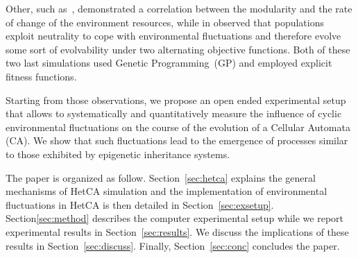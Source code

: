 Other, such as~\cite{lipson2002origin}, demonstrated a correlation between the modularity and the rate of change of the environment resources, while in \cite{yu2007program} observed that populations exploit neutrality to cope with environmental fluctuations and therefore evolve some sort of evolvability under two alternating objective functions. Both of these two last simulations used Genetic Programming~(GP) and employed explicit fitness functions.

Starting from those observations, we propose an open ended experimental setup that allows to systematically and quantitatively measure the influence of cyclic environmental fluctuations on the course of the evolution of a Cellular Automata (CA). We show that such fluctuations lead to the emergence of processes similar to those exhibited by epigenetic inheritance systems. 

The paper is organized as follow. Section~\ref{sec:hetca} explains the general mechanisms of HetCA simulation and the implementation of environmental fluctuations in HetCA is then detailed in Section~\ref{sec:exsetup}. Section\ref{sec:method} describes the computer experimental setup while we report experimental results in Section~\ref{sec:results}. We discuss the implications of these results in Section~\ref{sec:discuss}. Finally, Section~\ref{sec:conc} concludes the paper.

